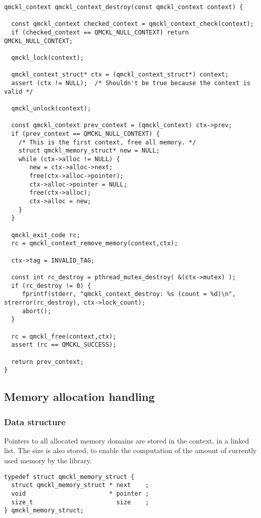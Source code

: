 \begin{verbatim}
qmckl_context qmckl_context_destroy(const qmckl_context context) {

  const qmckl_context checked_context = qmckl_context_check(context);
  if (checked_context == QMCKL_NULL_CONTEXT) return QMCKL_NULL_CONTEXT;

  qmckl_lock(context);
  
  qmckl_context_struct* ctx = (qmckl_context_struct*) context;
  assert (ctx != NULL);  /* Shouldn't be true because the context is valid */

  qmckl_unlock(context);

  const qmckl_context prev_context = (qmckl_context) ctx->prev;
  if (prev_context == QMCKL_NULL_CONTEXT) {
    /* This is the first context, free all memory. */
    struct qmckl_memory_struct* new = NULL;
    while (ctx->alloc != NULL) {
       new = ctx->alloc->next;
       free(ctx->alloc->pointer);
       ctx->alloc->pointer = NULL;
       free(ctx->alloc);
       ctx->alloc = new;
    }
  }
  
  qmckl_exit_code rc;
  rc = qmckl_context_remove_memory(context,ctx);

  ctx->tag = INVALID_TAG;

  const int rc_destroy = pthread_mutex_destroy( &(ctx->mutex) );
  if (rc_destroy != 0) {
     fprintf(stderr, "qmckl_context_destroy: %s (count = %d)\n", strerror(rc_destroy), ctx->lock_count);
     abort();
  }

  rc = qmckl_free(context,ctx);
  assert (rc == QMCKL_SUCCESS);

  return prev_context;
}
\end{verbatim}
\subsection{Memory allocation handling}
\label{sec:orgefbc5fb}

\subsubsection{Data structure}
\label{sec:orgdddff50}

Pointers to all allocated memory domains are stored in the context,
in a linked list. The size is also stored, to enable the
computation of the amount of currently used memory by the library.

\begin{verbatim}
typedef struct qmckl_memory_struct {
  struct qmckl_memory_struct * next    ;
  void                       * pointer ;
  size_t                       size    ;
} qmckl_memory_struct;
\end{verbatim}

